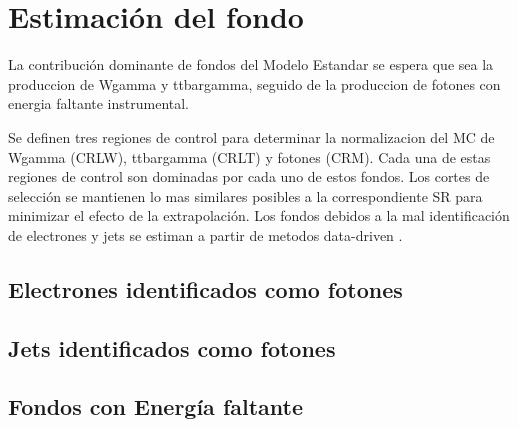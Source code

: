 \chapter{Estimaci\'on del fondo}

La contribuci\'on dominante de fondos del Modelo Estandar se espera que sea la produccion de  Wgamma
 y ttbargamma, seguido de la produccion de fotones con energia faltante instrumental.

Se definen tres regiones de control para determinar la normalizacion del MC de Wgamma (CRLW),
ttbargamma (CRLT) y fotones (CRM). Cada una de estas regiones de control son dominadas por cada uno
de estos fondos.
Los cortes de selecci\'on se mantienen lo mas similares posibles a la correspondiente SR para
minimizar el efecto de la extrapolaci\'on. Los fondos debidos a la mal identificaci\'on de
electrones y jets se estiman a partir de metodos data-driven .

\section{Electrones identificados como fotones}

\section{Jets identificados como fotones}


\section{Fondos con Energ\'ia faltante}
